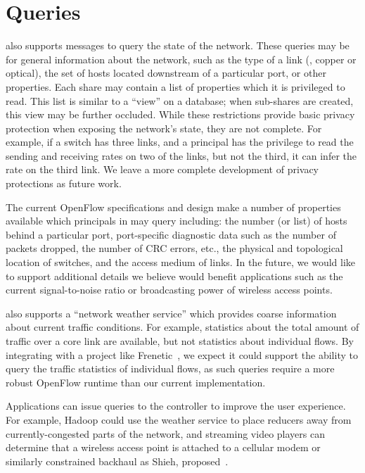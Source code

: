 \section{Queries}
\label{sec:Queries}

\sys also supports messages to query the state of the network.
These queries may be for general information about the network,
such as the type of a link (\eg, copper or optical), the set of hosts
located downstream of a particular port, or other properties.
Each share may contain a list of properties which it is privileged
to read. This list is similar to a ``view'' on a database; when sub-shares
are created, this view may be further occluded. While these restrictions
provide basic privacy protection when exposing the network's state,
they are not complete. For example, if a switch has three links, and
a principal has the privilege to read the sending and receiving rates
on two of the links, but not the third, it can infer the rate on the third link.
We leave a more complete development of privacy protections as
future work.

The current OpenFlow specifications and design make a number of
properties available which principals in \sys may query including:
 the number (or list) of hosts behind a particular
port, port-specific diagnostic data such as the number of packets
dropped, the number of CRC errors, etc., the physical and topological
location of switches, and the access medium of links. In the future,
we would like to support additional details we believe would
benefit applications such as the current signal-to-noise ratio or
broadcasting power of wireless access points.

\sys also supports a ``network weather service'' which provides coarse
information about current traffic conditions. For example, statistics
about the total amount of traffic over a core link are available, but
not statistics about individual flows. By integrating \sys with a
project like Frenetic~\cite{Foster:2010}, we expect it could support
the ability to query the traffic statistics of individual flows, as
such queries require a more robust OpenFlow runtime than our current
implementation.

Applications can issue queries to the \sys controller to improve the
user experience. For example, Hadoop could use the weather service to
place reducers away from currently-congested parts of the network, and
streaming video players can determine that a wireless access point is
attached to a cellular modem or similarly constrained backhaul as
Shieh, \etal proposed~\cite{Shieh11netquery}.

